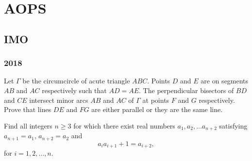 \chapter{AOPS}
\section{IMO}
\subsection{2018}
\bq{}{}
Let $\Gamma$ be the circumcircle of acute triangle $ABC$. Points $D$ and $E$ are on segments $AB$ and $AC$ respectively such that $AD = AE$. 
The perpendicular bisectors of $BD$ and $CE$ intersect minor arcs $AB$ and $AC$ of $\Gamma$ at points $F$ and $G$ respectively. 
Prove that lines $DE$ and $FG$ are either parallel or they are the same line.

\begin{center}
\end{center}
\eq

\bq{}{}
Find all integers $n \geq 3$ for which there exist real numbers $a_1, a_2, \dots a_{n + 2}$ satisfying $a_{n + 1} = a_1$, $a_{n + 2} = a_2$ and
$$a_ia_{i + 1} + 1 = a_{i + 2},$$for $i = 1, 2, \dots, n$.
\eq

